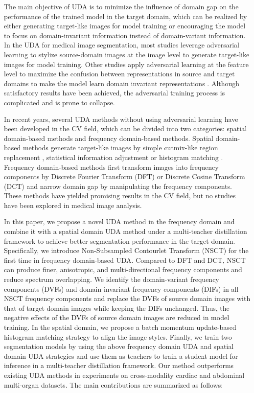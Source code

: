 \documentclass[letterpaper]{article} %
\begin{document}
The main objective of UDA is to minimize the influence of domain gap on the performance of the trained model in the target domain,
which can be realized by either generating target-like images for model training or encouraging the model to focus on domain-invariant
information instead of domain-variant information. In the UDA for medical image segmentation, most studies leverage adversarial learning
to stylize source-domain images at the image level \cite{1,2,13,14,16,17,18,41} to generate target-like images for model training. Other studies
apply adversarial learning at the feature level to maximize the confusion between representations in source and target domains to
make the model learn domain invariant representations \cite{20,21}. Although satisfactory results have been achieved, the adversarial training
process  is complicated and is prone to collapse.

In recent years, several UDA methods without using adversarial learning have been developed in the CV field, which can be
divided into two categories: spatial domain-based methods and frequency domain-based methods. Spatial domain-based methods generate target-like images
by simple cutmix-like region replacement \cite{22}, statistical information adjustment \cite{23,24}
or histogram matching \cite{26}. Frequency domain-based methods first
transform images into frequency components by Discrete Fourier Transform (DFT) \cite{19,26} or Discrete Cosine Transform (DCT) \cite{27} and narrow
domain gap by manipulating the frequency components. These methods have yielded promising results in the CV field,
but no studies have been explored in medical image analysis.

In this paper, we propose a novel UDA method in the frequency domain and combine it with a spatial domain UDA method under a multi-teacher
distillation framework to achieve better segmentation performance in the target domain. Specifically, we introduce Non-Subsampled Contourlet
Transform (NSCT) for the first time in frequency domain-based UDA. Compared to DFT and DCT, NSCT can produce finer, anisotropic, and multi-directional
frequency components and reduce spectrum overlapping. We identify the domain-variant frequency components (DVFs) and domain-invariant frequency components (DIFs)
in all NSCT frequency components and replace the DVFs of source
domain images with that of target domain images while keeping the DIFs unchanged. Thus, the negative effects of the DVFs of source domain images are
reduced in model training. In the spatial domain, we propose a batch momentum update-based histogram matching strategy to align the image styles.
Finally, we train two segmentation models by using the above frequency domain UDA and spatial domain UDA strategies and use them as teachers to train
a student model for inference in a multi-teacher distillation framework. Our method
outperforms existing UDA methods in experiments on cross-modality cardiac and abdominal multi-organ datasets. The main contributions are summarized as follows:
\end{document}
